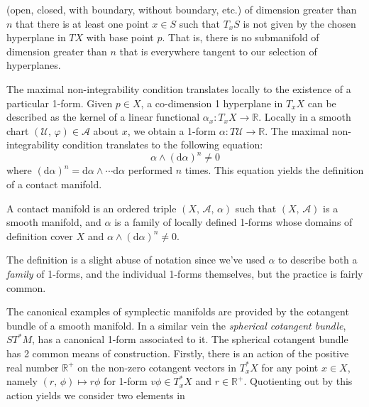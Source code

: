     (open, closed, with boundary, without boundary, etc.)
    of dimension greater than $n$ that there is at least one point
    $x\in{S}$ such that $T_{x}S$ is not given by the chosen hyperplane in $TX$
    with base point $p$. That is, there is no submanifold of dimension greater
    than $n$ that is everywhere tangent to our selection of hyperplanes.
    \par\hfill\par
    The maximal non-integrability condition translates locally to the existence
    of a particular 1-form. Given $p\in{X}$, a co-dimension 1 hyperplane in
    $T_{x}X$ can be described as the kernel of a linear functional
    $\alpha_{x}:T_{x}X\rightarrow\mathbb{R}$. Locally in a smooth chart
    $(\mathcal{U},\,\varphi)\in\mathcal{A}$ about $x$, we obtain a 1-form
    $\alpha:T\mathcal{U}\rightarrow\mathbb{R}$. The maximal non-integrability
    condition translates to the following equation:
    \begin{equation}
        \alpha\land(\textrm{d}\alpha)^{n}\ne{0}
    \end{equation}
    where $(\textrm{d}\alpha)^{n}=\textrm{d}\alpha\land\cdots\textrm{d}\alpha$
    performed $n$ times. This equation yields the definition of a contact
    manifold.
    \begin{definition}
        A contact manifold is an ordered triple $(X,\,\mathcal{A},\,\alpha)$
        such that $(X,\,\mathcal{A})$ is a smooth manifold, and
        $\alpha$ is a family of locally defined 1-forms whose domains of
        definition cover $X$ and $\alpha\land(\textrm{d}\alpha)^{n}\ne{0}$.
    \end{definition}
    The definition is a slight abuse of notation since we've used $\alpha$ to
    describe both a \textit{family} of 1-forms, and the individual 1-forms
    themselves, but the practice is fairly common.
    \par\hfill\par
    The canonical examples of symplectic manifolds are provided by the
    cotangent bundle of a smooth manifold. In a similar vein the
    \textit{spherical cotangent bundle}, $ST^{*}M$, has a canonical
    1-form associated to it. The spherical cotangent bundle has 2 common means
    of construction. Firstly, there is an action of the positive
    real number $\mathbb{R}^{+}$ on the non-zero cotangent vectors in
    $T^{*}_{x}X$ for any point $x\in{X}$, namely
    $(r,\,\phi)\mapsto{r}\phi$ for 1-form $v\phi\in{T}^{*}_{x}X$ and
    $r\in\mathbb{R}^{+}$.
    Quotienting out by this action yields we consider two elements in
